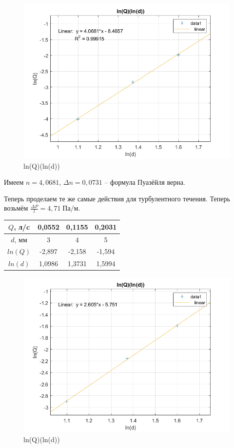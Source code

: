 \documentclass[a4paper, 12pt]{article} %
\begin{document}
\begin{figure}[!h]
    \centering
    \includegraphics[width = 12 cm]{qr}
    \caption{ln(Q)(ln(d))}
    \label{fig:vac}
\end{figure}

Имеем $n = 4,0681$, $\Delta n = 0,0731$ -- формула Пуазёйля верна.

Теперь проделаем те же самые действия для турбулентного течения. Теперь возьмём $\frac{\Delta P}{l}  = 4,71 \; \text{Па/м}$.

\begin{center}
\begin{tabular}{|c|c|c|c|}
\hline
$Q$, л/c & 0,0552  & 0,1155  & 0,2031  \\ \hline
$d$, мм  & 3      & 4      & 5      \\ \hline
$ln(Q)$  & -2,897 & -2,158 & -1,594 \\ \hline
$ln(d)$  & 1,0986 & 1,3731 & 1,5994 \\ \hline
\end{tabular}
\end{center}

\begin{figure}[!h]
    \centering
    \includegraphics[width = 12 cm]{qr_turb}
    \caption{ln(Q)(ln(d))}
    \label{fig:vac}
\end{figure}
\end{document}
